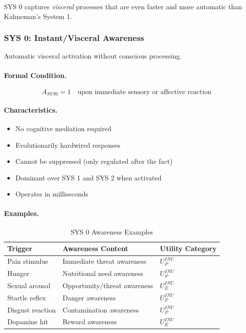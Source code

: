 SYS 0 captures \emph{visceral} processes that are even faster and more 
automatic than Kahneman's System 1.

\subsubsection{SYS 0: Instant/Visceral Awareness}

\begin{definition}
\label{def:sys0}
Automatic visceral activation without conscious processing.
\end{definition}

\paragraph{Formal Condition.}
\begin{equation}
A_{SYS0} = 1 \quad \text{upon immediate sensory or affective reaction}
\end{equation}

\paragraph{Characteristics.}
\begin{itemize}
\item No cognitive mediation required
\item Evolutionarily hardwired responses
\item Cannot be suppressed (only regulated after the fact)
\item Dominant over SYS 1 and SYS 2 when activated
\item Operates in milliseconds
\end{itemize}

\paragraph{Examples.}
\begin{table}[htbp]
\centering
\caption{SYS 0 Awareness Examples}
\label{tab:sys0-examples}
\renewcommand{\arraystretch}{1.3}
\begin{tabular}{@{}lll@{}}
\toprule
\textbf{Trigger} & \textbf{Awareness Content} & \textbf{Utility Category} \\
\midrule
Pain stimulus & Immediate threat awareness & $U^{INU}_{P}$ \\
Hunger & Nutritional need awareness & $U^{INU}_{P}$ \\
Sexual arousal & Opportunity/threat awareness & $U^{INU}_{E}$ \\
Startle reflex & Danger awareness & $U^{INU}_{P}$ \\
Disgust reaction & Contamination awareness & $U^{INU}_{P}$ \\
Dopamine hit & Reward awareness & $U^{INU}_{E}$ \\
\bottomrule
\end{tabular}
\end{table}

